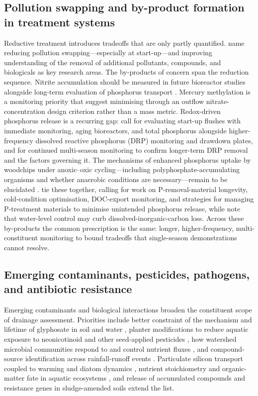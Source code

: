 \subsection{Pollution swapping and by-product formation in treatment systems}

Reductive treatment introduces tradeoffs that are only partly quantified.
\textcite{Christianson2021} name reducing pollution swapping---especially at
start-up---and improving understanding of the removal of additional pollutants,
compounds, and biologicals as key research areas. The by-products of concern
span the reduction sequence. Nitrite accumulation should be measured in future
bioreactor studies alongside long-term evaluation of phosphorus transport
\parencite{Bell2015}. Mercury methylation is a monitoring priority that
\textcite{Maxwell2022} suggest minimising through an outflow
nitrate-concentration design criterion rather than a mass metric. Redox-driven
phosphorus release is a recurring gap: \textcite{Bailon2025} call for evaluating
start-up flushes with immediate monitoring, aging bioreactors, and total
phosphorus alongside higher-frequency dissolved reactive phosphorus (DRP)
monitoring and drawdown plates, and \textcite{Rivas2020} for continued
multi-season monitoring to confirm longer-term DRP removal and the factors
governing it. The mechanisms of enhanced phosphorus uptake by woodchips under
anoxic--oxic cycling---including polyphosphate-accumulating organisms and whether
anaerobic conditions are necessary---remain to be elucidated
\parencite{Zhang2024b}. \textcite{Strock2025} tie these together, calling for
work on P-removal-material longevity, cold-condition optimisation, DOC-export
monitoring, and strategies for managing P-treatment materials to minimise
unintended phosphorus release, while \textcite{Schilling2023} note that
water-level control may curb dissolved-inorganic-carbon loss. Across these
by-products the common prescription is the same: longer, higher-frequency,
multi-constituent monitoring to bound tradeoffs that single-season demonstrations
cannot resolve.

\subsection{Emerging contaminants, pesticides, pathogens, and antibiotic resistance}

Emerging contaminants and biological interactions broaden the constituent scope
of drainage assessment. Priorities include better constraint of the mechanism
and lifetime of glyphosate in soil and water \parencite{Spiese2023}, planter
modifications to reduce aquatic exposure to neonicotinoid and other seed-applied
pesticides \parencite{Schaafsma2019}, how watershed microbial communities respond
to and control nutrient fluxes \parencite{Knorr2023}, and compound-source
identification across rainfall-runoff events \parencite{Fraindová2022}.
Particulate silicon transport coupled to warming and diatom dynamics
\parencite{Sethna2022}, nutrient stoichiometry and organic-matter fate in aquatic
ecosystems \parencite{Manninen2023,Manninen2018}, and release of accumulated
compounds and resistance genes in sludge-amended soils \parencite{Ghirardini2019}
extend the list.

